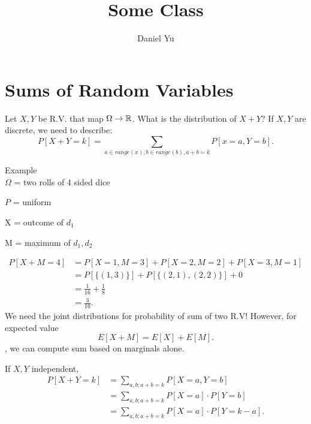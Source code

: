 \documentclass[a4paper]{article}
\title{\Huge{Some Class}}
\author{\huge{Daniel Yu}}
\date{}
\begin{document}
\maketitle
\newpage%
\tableofcontents
\pagebreak
\section{Sums of Random Variables}
\begin{definition}
 Let $X,Y$ be R.V. that map  $\Omega \to \mathbb{R}$. What is the distribution of 
$X+Y$? If $X,Y$ are discrete, we need to describe:
 \[
   P[X+Y =k] = \sum_{a \in range(x), b \in range(b), a + b =k} P[x=a,Y=b] 
.\]  
\end{definition}

\begin{note}{Example}\\
  $\Omega$ = two rolls of 4 sided dice

   $P$ = uniform

   X = outcome of $d_1$

   M = maximum of  $d_1,d_2$
 
   \begin{align*}
     P[X + M = 4] &= P[X=1, M=3] + P[X=2,M=2] + P[X=3, M=1] \\
                  &= P[\{(1,3)\}] + P[\{(2,1),(2,2)\}] + 0 \\
                  &= \frac{1}{16} + \frac{1}{8} \\
                  &= \frac{3}{16}
   .\end{align*}
   We need the joint distributions for probability of sum of two R.V! However, for expected value
   \[
     E[X+M] = E[X] + E[M]
   .\], we can compute sum  based on marginals alone.
\end{note}

\begin{definition}
  If $X,Y$ independent, 
   \begin{align*}
     P[X + Y = k] &= \sum_{a,b;a + b = k} P[X=a,Y=b] \\
                  &= \sum_{a,b; a+b=k} P[X=a] \cdot P[Y=b] \\
                  &= \sum_{a,b;a+b=k} P[X=a] \cdot P[Y = k-a]
  .\end{align*}
\end{definition}
\end{document}
